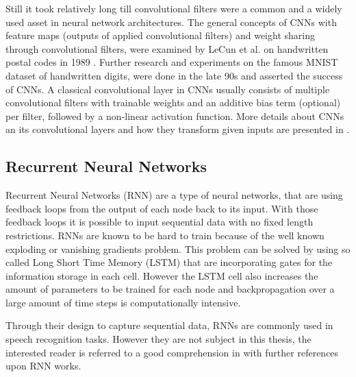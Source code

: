 Still it took relatively long till convolutional filters were a common and a widely used asset in neural network architectures.
The general concepts of CNNs with feature maps (outputs of applied convolutional filters) and weight sharing through convolutional filters, were examined by LeCun et al. on handwritten postal codes in 1989 \cite{LeCun1989_Generalization}.
Further research and experiments on the famous MNIST dataset of handwritten digits, were done in the late 90s \cite{LeCun1998} and asserted the success of CNNs.
A classical convolutional layer in CNNs usually consists of multiple convolutional filters with trainable weights and an additive bias term (optional) per filter, followed by a non-linear activation function.
More details about CNNs an its convolutional layers and how they transform given inputs are presented in .




\subsection{Recurrent Neural Networks}\label{sec:prev_nn_rnn}
Recurrent Neural Networks (RNN) are a type of neural networks, that are using feedback loops from the output of each node back to its input.
With those feedback loops it is possible to input sequential data with no fixed length restrictions.
RNNs are known to be hard to train because of the well known exploding or vanishing gradients problem.
This problem can be solved by using so called Long Short Time Memory (LSTM) that are incorporating gates for the information storage in each cell. 
However the LSTM cell also increases the amount of parameters to be trained for each node and backpropagation over a large amount of time steps is computationally intensive.

Through their design to capture sequential data, RNNs are commonly used in speech recognition tasks.
However they are not subject in this thesis, the interested reader is referred to a good comprehension in \cite{Staudenmeyer2019} with further references upon RNN works.



